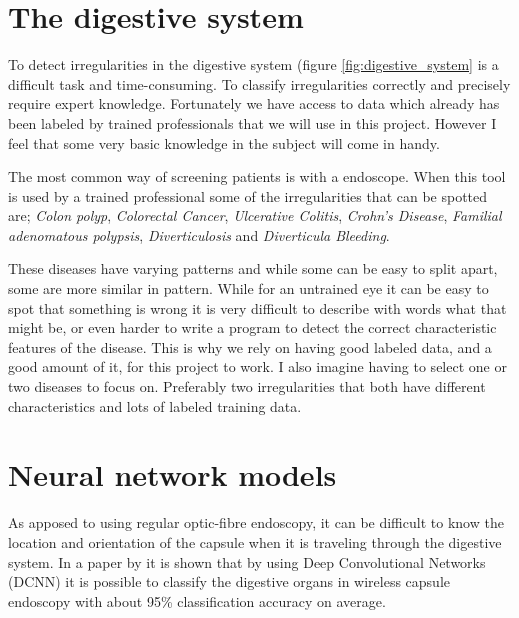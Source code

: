 \documentclass[english, a4paper]{report}
\begin{document}
\section{The digestive system}  \label{the_digestive_system}

To detect irregularities in the digestive system (figure \ref{fig:digestive_system} is a difficult task and time-consuming. To classify irregularities correctly and precisely require expert knowledge. Fortunately we have access to data which already has been labeled by trained professionals that we will use in this project. However I feel that some very basic knowledge in the subject will come in handy.

The most common way of screening patients is with a endoscope. When this tool is used by a trained professional some of the irregularities that can be spotted are; \textit{Colon polyp}, \textit{Colorectal Cancer}, \textit{Ulcerative Colitis}, \textit{Crohn's Disease}, \textit{Familial adenomatous polypsis}, \textit{Diverticulosis} and \textit{Diverticula Bleeding}. 

These diseases have varying patterns and while some can be easy to split apart, some are more similar in pattern. While for an untrained eye it can be easy to spot that something is wrong it is very difficult to describe with words what that might be, or even harder to write a program to detect the correct characteristic features of the disease. This is why we rely on having good labeled data, and a good amount of it, for this project to work. I also imagine having to select one or two diseases to focus on. Preferably two irregularities that both have different characteristics and lots of labeled training data.



\section{Neural network models}
As apposed to using regular optic-fibre endoscopy, it can be difficult to know the location and orientation of the capsule when it is traveling through the digestive system. In a paper by \citeauthor*{ClassifyingDigestive15} \cite{ClassifyingDigestive15} it is shown that by using Deep Convolutional Networks (DCNN) it is possible to classify the digestive organs in wireless capsule endoscopy with about 95\% classification accuracy on average. 
\end{document}
